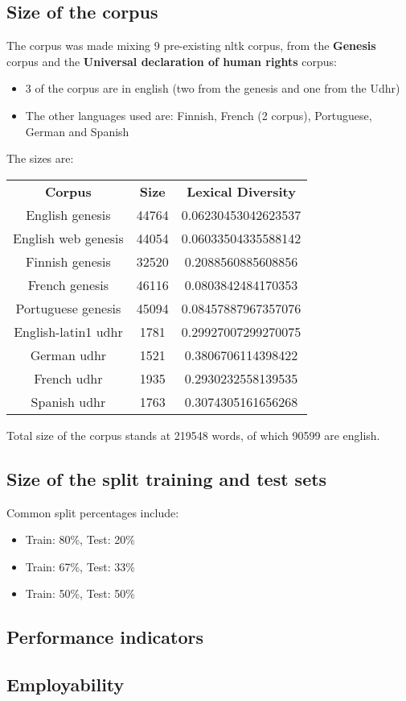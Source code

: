 \documentclass{article}
\begin{document}
        \subsection{Size of the corpus}
        The corpus was made mixing 9 pre-existing nltk corpus, from the \textbf{Genesis} corpus and the \textbf{Universal declaration of human rights} corpus:
            \begin{itemize}
                \item 3 of the corpus are in english (two from the genesis and one from the Udhr)
                \item The other languages used are: Finnish, French (2 corpus), Portuguese, German and Spanish 
            \end{itemize}
            The sizes are:
                \begin{center}
                    \begin{tabular}{c|c|c}
                        \textbf{Corpus} & \textbf{Size} & \textbf{Lexical Diversity} \\
                        English genesis & 44764 & 0.06230453042623537\\
                        English web genesis & 44054 & 0.06033504335588142 \\
                        Finnish genesis & 32520 & 0.2088560885608856\\
                        French genesis & 46116 & 0.0803842484170353\\
                        Portuguese genesis & 45094 & 0.08457887967357076\\
                        English-latin1 udhr & 1781 & 0.29927007299270075\\
                        German udhr & 1521 & 0.3806706114398422\\
                        French udhr & 1935 & 0.2930232558139535\\
                        Spanish udhr & 1763 & 0.3074305161656268\\
                    \end{tabular}
                \end{center}
                Total size of the corpus stands at 219548 words, of which 90599 are english.
            

        \subsection{Size of the split training and test sets}
        Common split percentages include:
            \begin{itemize}
                \item Train: 80\%, Test: 20\%
                \item Train: 67\%, Test: 33\%
                \item Train: 50\%, Test: 50\%
            \end{itemize}
            
        \subsection{Performance indicators}
            \paragraph{}
        \subsection{Employability}
\end{document}
